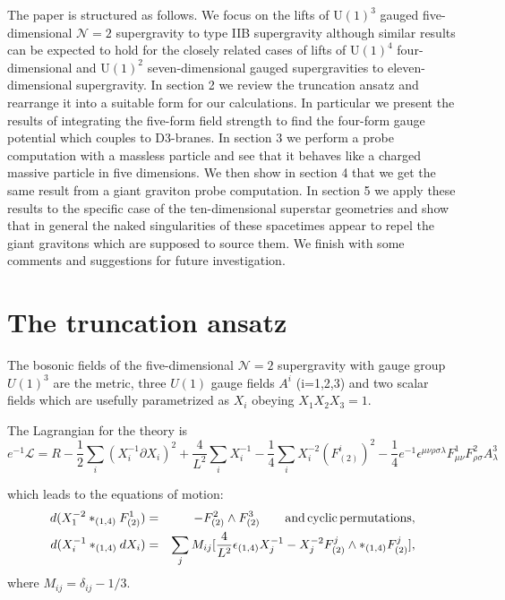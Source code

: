 \documentclass[a4paper,12pt]{article}
\begin{document}
The paper is structured as follows. We focus on the lifts of U$(1)^3$
gauged five-dimensional $\mathcal{N} = 2$ supergravity to type IIB supergravity
although similar results can be expected to hold for the closely related cases
of lifts of U$(1)^4$ four-dimensional and U$(1)^2$ seven-dimensional gauged
supergravities to
eleven-dimensional supergravity. In section 2 we review the truncation ansatz
and rearrange it into a suitable form for our calculations. In particular we
present the results of integrating the five-form field strength to find the
four-form gauge potential which couples to D3-branes. In section 3 we perform
a probe computation with a massless particle and see that it behaves like a
charged massive particle in five dimensions. We then show in section 4 that we
get the same result from a giant graviton probe computation. In section 5 we apply these results to the specific case of the ten-dimensional superstar geometries and show that in general the naked singularities of these spacetimes appear to repel the giant gravitons which are supposed to source them. We finish with some comments and suggestions for future investigation.

\section{The truncation ansatz}

The  bosonic fields of the five-dimensional $\mathcal{N} = 2$ supergravity with gauge group $U(1)^3$ are the metric, three $U(1)$ gauge fields $A^i$ (i=1,2,3) and two scalar fields which are usefully parametrized as $X_i$  obeying $X_1 X_2 X_3 = 1$.

The Lagrangian for the theory is 
\begin{equation}
  \label{eq:5dlagrangian}
  e^{-1} \mathcal{L} = R - \frac{1}{2} \sum_i (X_i^{-1} \partial X_i)^2 + \frac{4}{L^2} \sum_i X_i^{-1} - \frac{1}{4} \sum_i X_i^{-2}(F^i_{(2)})^2 - \frac{1}{4} e^{-1} \epsilon^{\mu \nu \rho \sigma \lambda} F^1_{\mu \nu} F^2_{ \rho \sigma} A^3_{\lambda}
\end{equation}

which leads to the equations of motion:
\begin{eqnarray}
  \label{eq:5deom1}
  d(X_1^{-2} *_{(1,4)} F^1_{(2)})  &=& - F^2_{(2)} \wedge F^3_{(2)} \rm{\qquad and \, cyclic \, permutations,}\\
  \label{eq:5deom2}
 d(X_i^{-1} *_{(1,4)} d X_i) &=&  \sum_j M_{i j} [\frac{4}{L^2} \epsilon_{(1,4)} X_j^{-1} - X_j^{-2} F^j_{(2)} \wedge *_{(1,4)} F^j_{(2)}] ,
\end{eqnarray}
where $ M_{i j} = \delta_{i j} - 1/3$.
\end{document}
